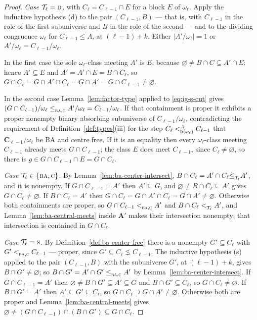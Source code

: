 \begin{proof}
\emph{Case $\mathcal T_{\ell}=\TD$,} with $C_{\ell}=C_{\ell-1}\cap E$ for a
block $E$ of $\omega_{\ell}$. Apply the inductive hypothesis (d) to the pair
$(C_{\ell-1},B)$ --- that is, with $C_{\ell-1}$ in the role of the first
subuniverse and $B$ in the role of the second --- and to the dividing
congruence $\omega_{\ell}$ for $C_{\ell-1}\le A$, at $(\ell-1)+k$. Either
$|A'/\omega_{\ell}|=1$ or $A'/\omega_{\ell}=C_{\ell-1}/\omega_{\ell}$.

In the first case the sole $\omega_{\ell}$-class meeting $A'$ is $E$, because
$\varnothing\neq B\cap C\subseteq A'\cap E$; hence $A'\subseteq E$ and
$A'=A'\cap E=B\cap C_{\ell}$, so
$G\cap C_{\ell}=G\cap A'\cap C_{\ell}=G\cap A'=G\cap C_{\ell-1}\neq\varnothing$.

In the second case Lemma~\ref{lem:factor-type} applied to
\eqref{eq:ig-s-cut} gives
$(G\cap C_{\ell-1})/\omega_{\ell}\subte{\TBA,\TC}A'/\omega_{\ell}=
C_{\ell-1}/\omega_{\ell}$. If that containment is proper it exhibits a proper
nonempty binary absorbing subuniverse of $C_{\ell-1}/\omega_{\ell}$,
contradicting the requirement of Definition~\ref{def:types}(iii) for the step
$C_{\ell}\subt[A]{\TD(\omega_{\ell})}C_{\ell-1}$ that
$\mathbf C_{\ell-1}/\omega_{\ell}$ be BA and centre free. If it is an equality
then every $\omega_{\ell}$-class meeting $C_{\ell-1}$ already meets
$G\cap C_{\ell-1}$; the class $E$ does meet $C_{\ell-1}$, since
$C_{\ell}\neq\varnothing$, so there is
$g\in G\cap C_{\ell-1}\cap E=G\cap C_{\ell}$.

\emph{Case $\mathcal T_{\ell}\in\{\TBA,\TC\}$.} By
Lemma~\ref{lem:ba-center-intersect}, $B\cap C_{\ell}=A'\cap C_{\ell}
\dsubte{\mathcal T_{\ell}}A'$, and it is nonempty. If
$G\cap C_{\ell-1}=A'$ then $A'\subseteq G$, and $\varnothing\neq B\cap
C_{\ell}\subseteq A'$ gives $G\cap C_{\ell}\neq\varnothing$. If
$B\cap C_{\ell}=A'$ then $G\cap C_{\ell}=G\cap A'\cap C_{\ell}=G\cap A'\neq
\varnothing$. Otherwise both containments are proper, so
$G\cap C_{\ell-1}\subt{\TBA,\TC}A'$ and $B\cap C_{\ell}
\subt{\mathcal T_{\ell}}A'$, and Lemma~\ref{lem:ba-central-meets} inside
$\mathbf A'$ makes their intersection nonempty; that intersection is contained
in $G\cap C_{\ell}$.

\emph{Case $\mathcal T_{\ell}=\TS$.} By Definition~\ref{def:ba-center-free}
there is a nonempty $G'\subseteq C_{\ell}$ with $G'\subt{\TBA,\TC}C_{\ell-1}$
--- proper, since $G'\subseteq C_{\ell}\lneq C_{\ell-1}$. The inductive
hypothesis (s) applied to the pair $(C_{\ell-1},B)$ with the subuniverse $G'$,
at $(\ell-1)+k$, gives $B\cap G'\neq\varnothing$; so
$B\cap G'=A'\cap G'\subte{\TBA,\TC}A'$ by
Lemma~\ref{lem:ba-center-intersect}. If $G\cap C_{\ell-1}=A'$ then
$\varnothing\neq B\cap G'\subseteq A'\subseteq G$ and $B\cap G'\subseteq
C_{\ell}$, so $G\cap C_{\ell}\neq\varnothing$. If $B\cap G'=A'$ then
$A'\subseteq G'\subseteq C_{\ell}$, so $G\cap C_{\ell}\supseteq G\cap A'\neq
\varnothing$. Otherwise both are proper and
Lemma~\ref{lem:ba-central-meets} gives
$\varnothing\neq(G\cap C_{\ell-1})\cap(B\cap G')\subseteq G\cap C_{\ell}$.


\end{proof}

